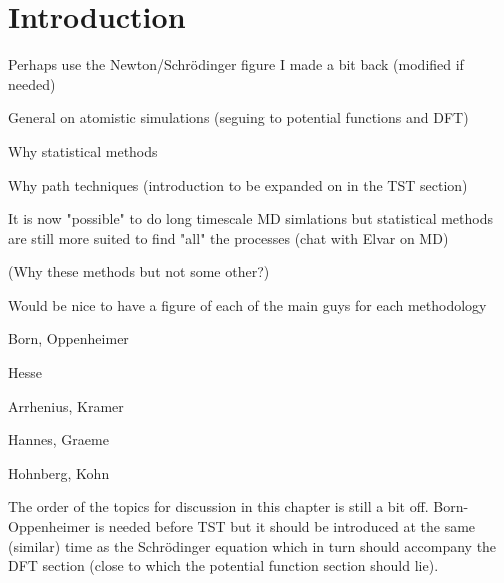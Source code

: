 \section{Introduction}
\label{sec:methods-introduction}

\bit
\item Perhaps use the Newton/Schr\"odinger figure I made a bit back (modified if needed)
\item General on atomistic simulations (seguing to potential functions and DFT)
\item Why statistical methods
\item Why path techniques (introduction to be expanded on in the TST section)
\item It is now "possible" to do long timescale MD simlations but statistical methods are still more suited to find "all" the processes (chat with Elvar on MD)
\item (Why these methods but not some other?)

\item Would be nice to have a figure of each of the main guys for each methodology
\bit
\item Born, Oppenheimer
\item Hesse
\item Arrhenius, Kramer
\item Hannes, Graeme
\item Hohnberg, Kohn
\eit
\eit

The order of the topics for discussion in this chapter is still a bit off.
Born-Oppenheimer is needed before TST but it should be introduced at the same (similar) time as the Schr\"odinger equation which in turn should accompany the DFT section (close to which the potential function section should lie).

\placeholder
